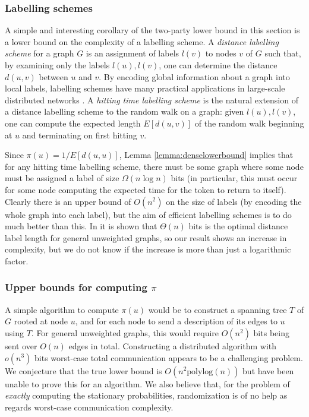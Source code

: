 \documentclass[twocolumn]{article}
\begin{document}
\subsubsection{Labelling schemes}

A simple and interesting corollary of the two-party lower bound in this section is a lower bound on the complexity of a labelling scheme. A {\em distance labelling scheme} for a graph $G$ is an assignment of labels $l(v)$ to nodes $v$ of $G$ such that, by examining only the labels $l(u),l(v)$, one can determine the distance $d(u,v)$ between $u$ and $v$. By encoding global information about a graph into local labels, labelling schemes have many practical applications in large-scale distributed networks \cite{gavoille01distance}. A {\em hitting time labelling scheme} is the natural extension of a distance labelling scheme to the random walk on a graph: given $l(u),l(v)$, one can compute the expected length $E[d(u,v)]$ of the random walk beginning at $u$ and terminating on first hitting $v$.

Since $\pi(u) = 1 / E[d(u,u)]$, Lemma \ref{lemma:denselowerbound} implies that for any hitting time labelling scheme, there must be some graph where some node must be assigned a label of size $\Omega(n \log n)$ bits (in particular, this must occur for some node computing the expected time for the token to return to itself). Clearly there is an upper bound of $O(n^2)$ on the size of labels (by encoding the whole graph into each label), but the aim of efficient labelling schemes is to do much better than this. In \cite{gavoille01distance} it is shown that $\Theta(n)$ bits is the optimal distance label length for general unweighted graphs, so our result shows an increase in complexity, but we do not know if the increase is more than just a logarithmic factor.

\subsubsection{Upper bounds for computing $\pi$}

A simple algorithm to compute $\pi(u)$ would be to construct a spanning tree $T$ of $G$ rooted at node $u$, and for each node to send a description of its edges to $u$ using $T$. For general unweighted graphs, this would require $O(n^2)$ bits being sent over $O(n)$ edges in total. Constructing a distributed algorithm with $o(n^3)$ bits worst-case total communication appears to be a challenging problem. We conjecture that the true lower bound is $O(n^2 \mbox{polylog}(n))$ but have been unable to prove this for an algorithm. We also believe that, for the problem of {\em exactly} computing the stationary probabilities, randomization is of no help as regards worst-case communication complexity.
\end{document}
